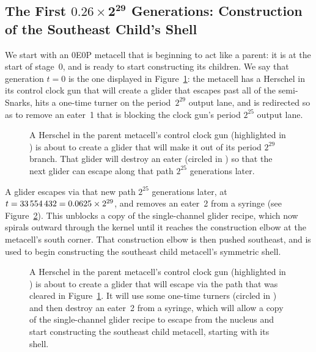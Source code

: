 

\subsection{The First $\mathbf{0.26 \times 2^{29}}$ Generations: Construction of the Southeast Child's Shell}\label{sec:0e0p_timeline_shell}

We start with an 0E0P metacell that is beginning to act like a parent: it is at the start of stage~$0$, and is ready to start constructing its children. We say that generation $t = 0$ is the one displayed in Figure~\ref{fig:0e0p_timeline_0}: the metacell has a Herschel in its control clock gun that will create a glider that escapes past all of the semi-Snarks, hits a one-time turner on the period~$2^{29}$ output lane, and is redirected so as to remove an eater~1 that is blocking the clock gun's period $2^{25}$ output lane.

\begin{figure}[!htb]
	\centering
	\caption{A Herschel in the parent metacell's control clock gun (highlighted in ) is about to create a glider that will make it out of its period $2^{29}$ branch. That glider will destroy an eater (circled in ) so that the next glider can escape along that path $2^{25}$ generations later.}
	\label{fig:0e0p_timeline_0}
\end{figure}

A glider escapes via that new path $2^{25}$ generations later, at $t = 33{\,}554{\,}432 = 0.0625 \times 2^{29}$, and removes an eater~2 from a syringe (see Figure~\ref{fig:0e0p_timeline_33554432}). This unblocks a copy of the single-channel glider recipe, which now spirals outward through the kernel until it reaches the construction elbow at the metacell's south corner. That construction elbow is then pushed southeast, and is used to begin constructing the southeast child metacell's symmetric shell.

\begin{figure}[!htb]
	\centering
	\caption{A Herschel in the parent metacell's control clock gun (highlighted in ) is about to create a glider that will escape via the path that was cleared in Figure~\ref{fig:0e0p_timeline_0}. It will use some one-time turners (circled in ) and then destroy an eater~2 from a syringe, which will allow a copy of the single-channel glider recipe to escape from the nucleus and start constructing the southeast child metacell, starting with its shell.}
	\label{fig:0e0p_timeline_33554432}
\end{figure}

